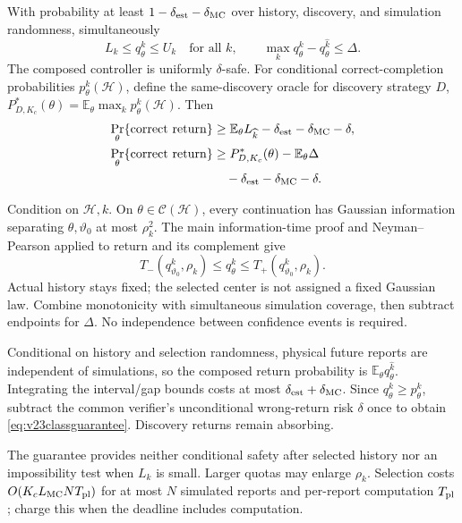 \begin{theorem}
\label{thm:v23selector}
With probability at least $1-\delta_{\rm est}-\delta_{\rm MC}$ over
history, discovery, and simulation randomness, simultaneously
$$
 L_k\leq q_\theta^k\leq U_k\quad\text{for all }k,\qquad
 \max_k q_\theta^k-q_\theta^{\widehat k}\leq\Delta.
$$
The composed controller is uniformly $\delta$-safe. For conditional
correct-completion probabilities $p_\theta^k(\mathcal H)$, define the
same-discovery oracle for discovery strategy $D$,
$P^*_{D,K_c}(\theta)=\mathbb E_\theta\max_k p_\theta^k(\mathcal H)$.
Then
\begin{equation}
 \begin{split}
 \Pr_\theta\{\mathrm{correct\ return}\}
 &\geq\mathbb E_\theta L_{\widehat k}-\delta_{\rm est}-\delta_{\rm MC}-\delta,\\
 \Pr_\theta\{\mathrm{correct\ return}\}
 &\geq P^*_{D,K_c}(\theta)-\mathbb E_\theta\Delta\\
 &\quad-\delta_{\rm est}-\delta_{\rm MC}-\delta.
 \end{split}
 \label{eq:v23classguarantee}
\end{equation}
\end{theorem}

\begin{IEEEproof}
Condition on $\mathcal H,k$. On $\theta\in\mathcal C(\mathcal H)$, every continuation has Gaussian information separating $\theta,\vartheta_0$ at most $\rho_k^2$. The main information-time proof and Neyman--Pearson applied to return and its complement give
$$T_-(q_{\vartheta_0}^k,\rho_k)\leq q_\theta^k
\leq T_+(q_{\vartheta_0}^k,\rho_k).$$
Actual history stays fixed; the selected center is not assigned a fixed Gaussian law. Combine monotonicity with simultaneous simulation coverage, then subtract endpoints for $\Delta$. No independence between confidence events is required.

Conditional on history and selection randomness, physical future reports are independent of simulations, so the composed return probability is $\mathbb E_\theta q_\theta^{\widehat k}$. Integrating the interval/gap bounds costs at most $\delta_{\rm est}+\delta_{\rm MC}$. Since $q_\theta^k\geq p_\theta^k$, subtract the common verifier's unconditional wrong-return risk $\delta$ once to obtain \eqref{eq:v23classguarantee}. Discovery returns remain absorbing.
\end{IEEEproof}

The guarantee provides neither conditional safety after selected history nor an impossibility test when $L_k$ is small. Larger quotas may enlarge $\rho_k$. Selection costs $O(K_cL_{\rm MC}NT_{\rm pl})$ for at most $N$ simulated reports and per-report computation $T_{\rm pl}$; charge this when the deadline includes computation.


